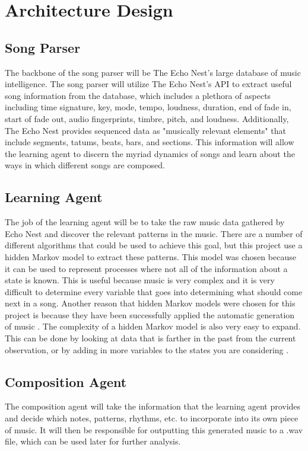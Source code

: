 \documentclass{article}
\begin{document}
\section{Architecture Design}
\subsection{Song Parser}
The backbone of the song parser will be The Echo Nest's large database of music intelligence. The song parser will utilize The Echo Nest's API to extract useful song information from the database, which includes a plethora of aspects including time signature, key, mode, tempo, loudness, duration, end of fade in, start of fade out, audio fingerprints, timbre, pitch, and loudness. Additionally, The Echo Nest provides sequenced data as "musically relevant elements" that include segments, tatums, beats, bars, and sections. This information will allow the learning agent to discern the myriad dynamics of songs and learn about the ways in which different songs are composed.

\subsection{Learning Agent}
The job of the learning agent will be to take the raw music data gathered by Echo Nest and discover the relevant patterns in the music. There are a number of different algorithms that could be used to achieve this goal, but this project use a hidden Markov model to extract these patterns. This model was chosen because it can be used to represent processes where not all of the information about a state is known. This is useful because music is very complex and it is very difficult to determine every variable that goes into determining what should come next in a song. Another reason that hidden Markov models were chosen for this project is because they have been successfully applied the automatic generation of music \cite{5492670}. The complexity of a hidden Markov model is also very easy to expand. This can be done by looking at data that is farther in the past from the current observation, or by adding in more variables to the states you are considering \cite{Wiki}.\\

\subsection{Composition Agent}
The composition agent will take the information that the learning agent provides and decide which notes, patterns, rhythms, etc. to incorporate into its own piece of music. It will then be responsible for outputting this generated music to a .wav file, which can be used later for further analysis.
\end{document}
